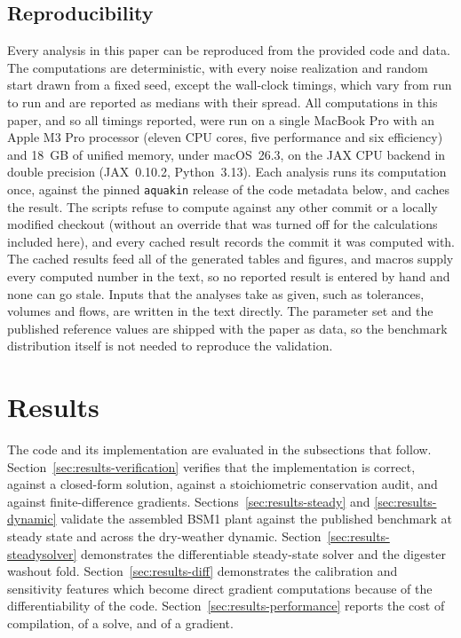 \documentclass{article}
\begin{document}
\subsection{Reproducibility}
\label{sec:methods-repro}

Every analysis in this paper can be reproduced from the provided code and data. The computations are deterministic, with every noise realization and random start drawn from a fixed seed, except the wall-clock timings, which vary from run to run and are reported as medians with their spread. All computations in this paper, and so all timings reported, were run on a single MacBook Pro with an Apple M3 Pro processor (eleven CPU cores, five performance and six efficiency) and 18~GB of unified memory, under macOS~26.3, on the JAX CPU backend in double precision (JAX~0.10.2, Python~3.13). Each analysis runs its computation once, against the pinned \texttt{aquakin} release of the code metadata below, and caches the result. The scripts refuse to compute against any other commit or a locally modified checkout (without an override that was turned off for the calculations included here), and every cached result records the commit it was computed with. The cached results feed all of the generated tables and figures, and macros supply every computed number in the text, so no reported result is entered by hand and none can go stale. Inputs that the analyses take as given, such as tolerances, volumes and flows, are written in the text directly. The parameter set and the published reference values are shipped with the paper as data, so the benchmark distribution itself is not needed to reproduce the validation.

\section{Results}
\label{sec:results}

The code and its implementation are evaluated in the subsections that follow. Section~\ref{sec:results-verification} verifies that the implementation is correct, against a closed-form solution, against a stoichiometric conservation audit, and against finite-difference gradients. Sections~\ref{sec:results-steady} and \ref{sec:results-dynamic} validate the assembled BSM1 plant against the published benchmark at steady state and across the dry-weather dynamic. Section~\ref{sec:results-steadysolver} demonstrates the differentiable steady-state solver and the digester washout fold. Section~\ref{sec:results-diff} demonstrates the calibration and sensitivity features which become direct gradient computations because of the differentiability of the code. Section~\ref{sec:results-performance} reports the cost of compilation, of a solve, and of a gradient.
\end{document}

